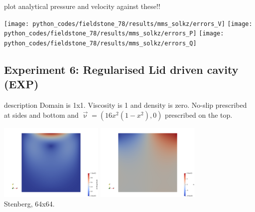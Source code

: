 plot analytical pressure and velocity against these!!

\begin{center}
\texttt{[image: python\_codes/fieldstone\_78/results/mms\_solkz/errors\_V]}
\texttt{[image: python\_codes/fieldstone\_78/results/mms\_solkz/errors\_P]}
\texttt{[image: python\_codes/fieldstone\_78/results/mms\_solkz/errors\_Q]} 
\end{center}





\newpage
\subsection*{Experiment 6: Regularised Lid driven cavity (EXP)}

{\color{red} description}
Domain is 1x1. Viscosity is 1 and density is zero. 
No-slip prescribed at sides and bottom and $\vec{\upnu}=(16x^2(1-x^2),0)$ prescribed on the top.

\begin{center}
\includegraphics[width=5cm]{python_codes/fieldstone_78/results/exp06/vel}
\includegraphics[width=5cm]{python_codes/fieldstone_78/results/exp06/p}\\
{\captionfont Stenberg, 64x64.}
\end{center}

